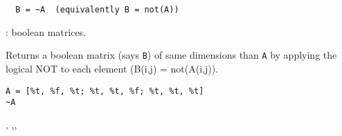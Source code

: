 \begin{mandesc}
\end{mandesc}

\begin{calling_sequence}
\begin{verbatim}
  B = ~A  (equivalently B = not(A))
\end{verbatim}
\end{calling_sequence}
\begin{parameters}
  \begin{varlist}
    : boolean matrices. 
  \end{varlist}
\end{parameters}

\begin{mandescription}
  Returns a boolean matrix (says \verb+B+) of same dimensions than \verb+A+ by applying
  the logical NOT to each element (B(i,j) = not(A(i,j)).
\end{mandescription}

\begin{examples}
\begin{Verbatim}
A = [%t, %f, %t; %t, %t, %f; %t, %t, %t]
~A
\end{Verbatim}

\end{examples}

\begin{manseealso}
  , ,,   
\end{manseealso}

